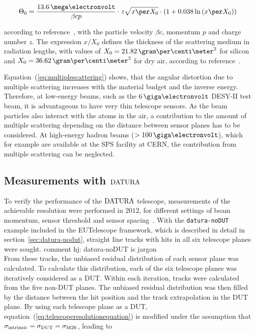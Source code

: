 \begin{equation}
\label{eq:multiplescattering}
\Theta_{0} = \frac{13.6\,\mega\electronvolt}{\beta c p} \cdot z
\sqrt{x \per X_0}
\cdot \left( 1 + 0.038 \ln{\left( x \per X_0\right) } \right)
\end{equation}

\noindent
according to reference~\cite{ref:PDG-2014}, with the particle velocity $\beta c$, momentum $p$ and charge number $z$. 
The expression $x/X_0$ defines the thickness of the scattering medium in radiation lengths,
 with values of $X_0 = 21.82\,\allowbreak\gram\per\centi\meter^2$ for silicon and $X_0 = 36.62\,\gram\per\centi\meter^2$ for dry air, according to reference~\cite{ref:x0values}.

Equation~(\ref{eq:multiplescattering}) shows, that the angular distortion due to multiple scattering increases with the material budget and the inverse energy.
Therefore, at low-energy beams, such as the $6\,\giga\electronvolt$ DESY-II test beam, it is advantageous to have very thin telescope sensors. 
As the beam particles also interact with the atoms in the air, a contribution to the amount of multiple scattering depending on the distance between sensor planes has to be considered. 
At high-energy hadron beams ($> 100\,\giga\electronvolt$), which for example are available at the SPS facility at CERN, the contribution from multiple scattering can be neglected.

\subsection{Measurements with $\textrm{DATURA}$}

To verify the performance of the $\textrm{DATURA}$ telescope, measurements of the achievable resolution were performed in $2012$, for different settings of beam momentum,
 sensor threshold and sensor spacing~\cite{ref:thomas}.
With the \texttt{datura-noDUT} example included in the {EUTelescope} framework, which is described in detail in section~\ref{sec:datura-nodut},
 straight line tracks with hits in all six telescope planes were sought. {comment hj: datura-noDUT is jargon}\\
From these tracks, the unbiased residual distribution of each sensor plane was calculated.
To calculate this distribution, each of the six telescope planes was iteratively considered as a DUT.
Within each iteration, tracks were calculated from the five non-DUT planes.
The unbiased residual distribution was then filled by the distance between the hit position and the track extrapolation in the DUT plane.
By using each telescope plane as a DUT, equation~(\ref{eq:telescoperesolutionequation}) is modified under the assumption that $\sigma_{\textrm{intrinsic}} = \sigma_{\textrm{DUT}} = \sigma_{\textrm{M26}}$,
 leading to


